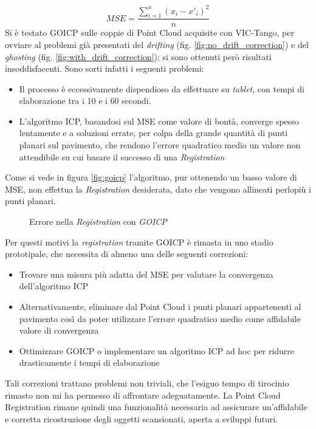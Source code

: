 $$
	MSE = \displaystyle\frac{\sum_{i=1}^{n} (x_i - x'_i)^2}{ n }
$$
Si è testato GOICP sulle coppie di Point Cloud acquisite con VIC-Tango, per ovviare al problemi già presentati del \emph{drifting} (fig. \ref{fig:no_drift_correction}) e del \emph{ghosting} (fig. \ref{fig:with_drift_correction}); si sono ottenuti però risultati insoddisfacenti. Sono sorti infatti i seguenti problemi:
\begin{itemize}
\item Il processo è eccessivamente dispendioso da effettuare su \emph{tablet}, con tempi di elaborazione tra i 10 e i 60 secondi.
\item L'algoritmo ICP, basandosi sul MSE come valore di bontà, converge spesso lentamente e  a soluzioni errate, per colpa della grande quantità di punti planari sul pavimento, che rendono l'errore quadratico medio un valore non attendibile su cui basare il successo di una \emph{Registration} 
\end{itemize}
Come si vede in figura \ref{fig:goicp} l'algoritmo, pur ottenendo un basso valore di MSE, non effettua la \emph{Registration} desiderata, dato che vengono allineati perlopiù i punti planari.
\begin{figure}[htp] 
    \centering
    \hfill%
    \hfill%
    \caption{Errore nella \emph{Registration} con \emph{GOICP}}
\end{figure}
\newline

\noindent
Per questi motivi la \emph{registration} tramite GOICP è rimasta in uno stadio prototipale, che necessita di almeno una delle seguenti correzioni:
\begin{itemize}
\item Trovare una misura più adatta del MSE per valutare la convergenza dell'algoritmo ICP
\item Alternativamente, eliminare dal Point Cloud i punti planari appartenenti al pavimento così da poter utilizzare l'errore quadratico medio come affidabile valore di convergenza
\item Ottimizzare GOICP o implementare un algoritmo ICP ad hoc per ridurre drasticamente i tempi di elaborazione
\end{itemize}
\noindent
Tali correzioni trattano problemi non triviali, che l'esiguo tempo di tirocinio rimasto non mi ha permesso di affrontare adeguatamente. La Point Cloud Registration rimane quindi una funzionalità necessaria ad assicurare un'affidabile e corretta ricostruzione degli oggetti scansionati, aperta a sviluppi futuri.

